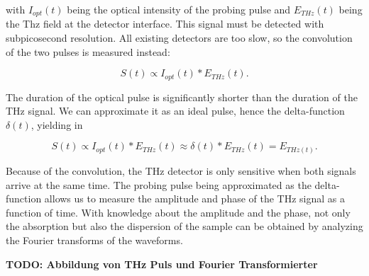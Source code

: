 with $I_{opt}(t)$ being the optical intensity of the probing pulse and $E_{THz}(t)$ being the Thz field at the detector interface. This signal must be detected with subpicosecond resolution. All existing detectors are too slow, so the convolution of the two pulses is measured instead: 

\begin{equation}
	S(t) \propto I_{opt}(t) \ast E_{THz}(t).
\end{equation}

The duration of the optical pulse is significantly shorter than the duration of the THz signal. We can approximate it as an ideal pulse, hence the delta-function $\delta(t)$, yielding in

\begin{equation}
	S(t) \propto I_{opt}(t) \ast E_{THz}(t) \approx \delta(t) \ast E_{THz}(t) = E_{THz(t)}.
\end{equation}

Because of the convolution, the THz detector is only sensitive when both signals arrive at the same time. The probing pulse being approximated as the delta-function allows us to measure the amplitude and phase of the THz signal as a function of time. With knowledge about the amplitude and the phase, not only the absorption but also the dispersion of the sample can be obtained by analyzing the Fourier transforms of the waveforms. 

\textbf{TODO: Abbildung von THz Puls und Fourier Transformierter}